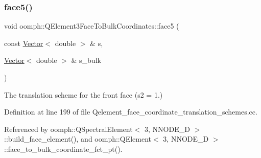 \subsubsection{\texorpdfstring{face5()}{face5()}}
{\footnotesize\ttfamily void oomph\+::\+Q\+Element3\+Face\+To\+Bulk\+Coordinates\+::face5 (\begin{DoxyParamCaption}\item[{const \hyperlink{classoomph_1_1Vector}{Vector}$<$ double $>$ \&}]{s,  }\item[{\hyperlink{classoomph_1_1Vector}{Vector}$<$ double $>$ \&}]{s\+\_\+bulk }\end{DoxyParamCaption})}



The translation scheme for the front face (s2 = 1.) 



Definition at line 199 of file Qelement\+\_\+face\+\_\+coordinate\+\_\+translation\+\_\+schemes.\+cc.



Referenced by oomph\+::\+Q\+Spectral\+Element$<$ 3, N\+N\+O\+D\+E\+\_\+D $>$\+::build\+\_\+face\+\_\+element(), and oomph\+::\+Q\+Element$<$ 3, N\+N\+O\+D\+E\+\_\+D $>$\+::face\+\_\+to\+\_\+bulk\+\_\+coordinate\+\_\+fct\+\_\+pt().

